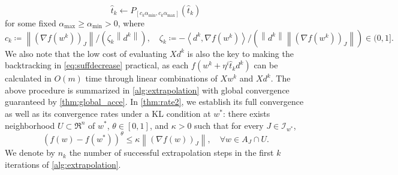 \documentclass{article}
\newcommand{\alert}[1]{{#1}}
\theoremstyle{plain}
\theoremstyle{definition}
\theoremstyle{remark}
\newcommand{\I}{\mathcal{I}}
\newcommand\inner[2]{\left\langle #1, #2 \right\rangle}
\newcommand{\norm}[1]{{\left\|{#1}\right\|}}
\begin{document}
\begin{equation}
	\hat t_k \leftarrow P_{[c_k \alpha_{\min}
	, c_k \alpha_{\max} ] } \left( \hat t_k \right)
	\label{eq:hattk}
\end{equation}
for some fixed $\alpha_{\max} \geq \alpha_{\min} > 0$,
where
\begin{equation}
 c_k \coloneqq \norm{(\nabla f(w^k))_{J} }/ (\zeta_k \norm{d^k}),
 \quad
	\zeta_k \coloneqq - \inner{d^k}{\nabla f(w^k)} /
	(\norm{d^k} \norm{(\nabla f(w^k))_{J} }) \in (0,1].
	\label{eq:cosine}
\end{equation}
We also note that the low cost of evaluating $X d^k$ is also the key
to making the backtracking in \cref{eq:suffdecrease} practical,
as each $f(w^k + \eta^i \hat t_k d^k)$ can be calculated in $O(m)$
time through linear combinations of $X w^k$ and $X d^k$.
The above procedure is summarized in
\cref{alg:extrapolation} \alert{with global convergence guaranteed 
by \cref{thm:global_acce}. In \cref{thm:rate2}, we establish its 
full convergence as well as its
convergence rates under a KL condition at $w^*$: there exists 
neighborhood $U \subset \Re^n$ of
$w^*$, $\theta \in [0,1]$, and $\kappa > 0$ such that for every $J
\in \I_{w^*}$, 
\begin{equation}
\left(f(w) - f(w^*)\right)^{{\theta}} \leq 
{\kappa } \norm{(\nabla
	f(w))_{J}},\quad \forall w\in A_J \cap U.
\label{eq:KL2}
\end{equation}
We denote
by $n_k$ the number of successful 
extrapolation 
steps in the
first $k$ iterations of \cref{alg:extrapolation}.}
\end{document}
